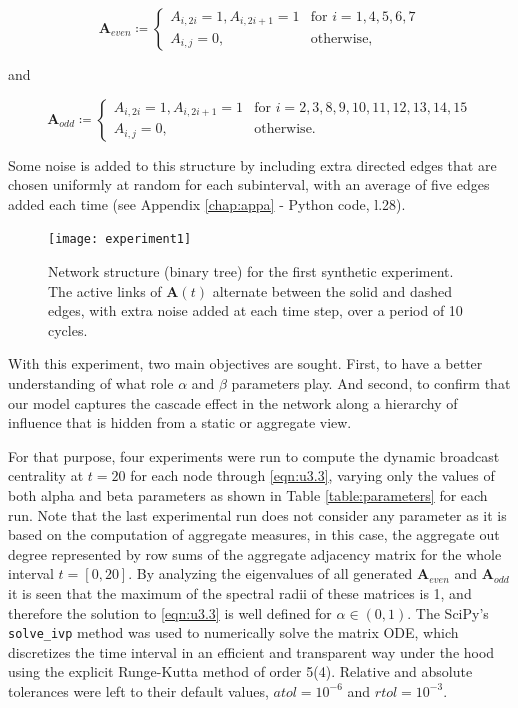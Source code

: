 \begin{equation*}
\mathbf{A}_{even}\coloneqq
    \begin{cases}
        A_{i,2i}=1, A_{i,2i+1}=1 & \text{for  } i=1,4,5,6,7\\
        A_{i,j}=0, & \text{otherwise,} 
    \end{cases}
\end{equation*}

and

\begin{equation*}
\mathbf{A}_{odd}\coloneqq
    \begin{cases}
        A_{i,2i}=1, A_{i,2i+1}=1 & \text{for  } i=2,3,8,9,10,11,12,13,14,15\\
        A_{i,j}=0, & \text{otherwise.} 
    \end{cases}
\end{equation*}

Some noise is added to this structure by including extra directed edges that are chosen uniformly at random for each subinterval, with an average of five edges added each time (see Appendix \ref{chap:appa} - Python code, l.28).

\begin{figure}[h]\centering
    \texttt{[image: experiment1]}
    \caption{Network structure (binary tree) for the first synthetic experiment. The active links of $\mathbf{A}(t)$ alternate between the solid and dashed edges, with extra noise added at each time step, over a period of 10 cycles.}
    \label{fig:exp1}
    \bigskip
\end{figure}

With this experiment, two main objectives are sought. First, to have a better understanding of what role $\alpha$ and $\beta$ parameters play. And second, to confirm that our model captures the cascade effect in the network along a hierarchy of influence that is hidden from a static or aggregate view.

For that purpose, four experiments were run to compute the dynamic broadcast centrality at $t=20$ for each node through \eqref{eqn:u3.3}, varying only the values of both alpha and beta parameters as shown in Table \ref{table:parameters} for each run. Note that the last experimental run does not consider any parameter as it is based on the computation of aggregate measures, in this case, the aggregate out degree represented by row sums of the aggregate adjacency matrix for the whole interval $t=[0,20]$. By analyzing the eigenvalues of all generated $\mathbf{A}_{even}$ and $\mathbf{A}_{odd}$ it is seen that the maximum of the spectral radii of these matrices is 1, and therefore the solution to \eqref{eqn:u3.3} is well defined for $\alpha\in(0,1)$. The SciPy’s \texttt{solve\_ivp} method was used to numerically solve the matrix ODE, which discretizes the time interval in an efficient and transparent way under the hood using the explicit Runge-Kutta method of order 5(4). Relative and absolute tolerances were left to their default values, $atol= 10^{-6}$ and $rtol=10^{-3}$. 

